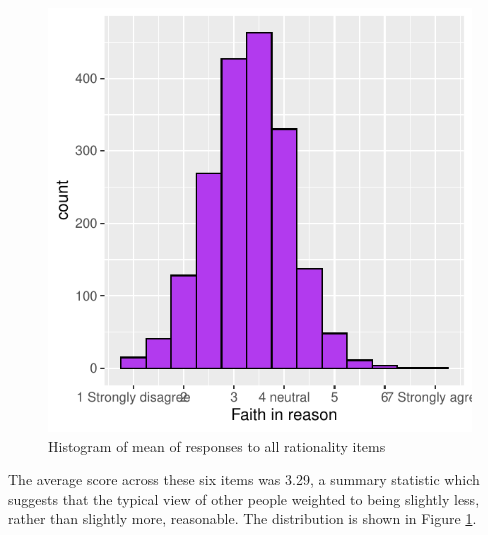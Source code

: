 \documentclass[
  ,jou,floatsintext]{apa6}
\begin{document}
\begin{figure}

{\centering \includegraphics[width=0.75\linewidth]{faithinreason_files/figure-latex/meanhistogram-1} 

}

\caption{Histogram of mean of responses to all rationality items}\label{fig:meanhistogram}
\end{figure}

The average score across these six items was 3.29, a summary statistic which suggests that the typical view of other people weighted to being slightly less, rather than slightly more, reasonable. The distribution is shown in Figure \ref{fig:meanhistogram}.
\end{document}
